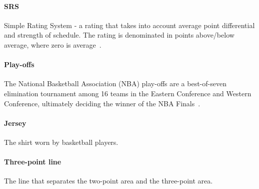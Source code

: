 \documentclass[]{sigchi}
\begin{document}
\paragraph{SRS} Simple Rating System - a rating that takes into account average
point differential and strength of schedule. The rating is denominated in points
above/below average, where zero is average~\cite{srs}. 

\paragraph{Play-offs} The National Basketball Association (NBA) play-offs are a
best-of-seven elimination tournament among 16 teams in the Eastern Conference
and Western Conference, ultimately deciding the winner of the NBA Finals~\cite{playoffs}.

\paragraph{Jersey} The shirt worn by basketball players.

\paragraph{Three-point line} The line that separates the two-point area and the three-point area.

\end{document}
